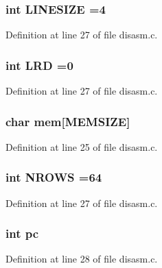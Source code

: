 \subsubsection[{L\+I\+N\+E\+S\+I\+ZE}]{\setlength{\rightskip}{0pt plus 5cm}int L\+I\+N\+E\+S\+I\+ZE =4}\label{disasm_8c_a05e97b595955acf197c818570ae8dbd5}


Definition at line 27 of file disasm.\+c.

\subsubsection[{L\+RD}]{\setlength{\rightskip}{0pt plus 5cm}int L\+RD =0}\label{disasm_8c_ad966c5921b463587836809645be5449d}


Definition at line 27 of file disasm.\+c.

\subsubsection[{mem}]{\setlength{\rightskip}{0pt plus 5cm}char mem[{\bf M\+E\+M\+S\+I\+ZE}]}\label{disasm_8c_a8ac88ddcfca819936451a3c3e3a07377}


Definition at line 25 of file disasm.\+c.

\subsubsection[{N\+R\+O\+WS}]{\setlength{\rightskip}{0pt plus 5cm}int N\+R\+O\+WS =64}\label{disasm_8c_a3b8c90730100048e219ae18a925eab22}


Definition at line 27 of file disasm.\+c.

\subsubsection[{pc}]{\setlength{\rightskip}{0pt plus 5cm}int pc}\label{disasm_8c_ac8c81e61335635fa4709d82412b31f06}


Definition at line 28 of file disasm.\+c.

